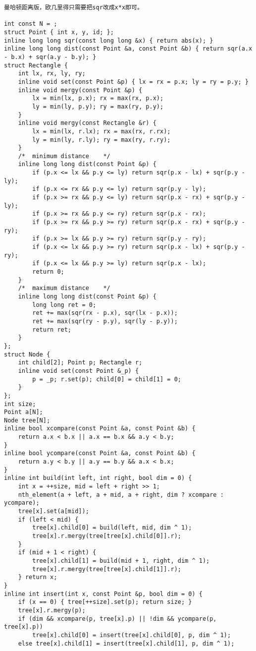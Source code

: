 \begin{lstlisting}
曼哈顿距离版，欧几里得只需要把sqr改成x*x即可。

int const N = ;
struct Point { int x, y, id; };
inline long long sqr(const long long &x) { return abs(x); }
inline long long dist(const Point &a, const Point &b) { return sqr(a.x - b.x) + sqr(a.y - b.y); }
struct Rectangle {
	int lx, rx, ly, ry;
	inline void set(const Point &p) { lx = rx = p.x; ly = ry = p.y; }
	inline void mergy(const Point &p) {
		lx = min(lx, p.x); rx = max(rx, p.x);
		ly = min(ly, p.y); ry = max(ry, p.y);
	}
	inline void mergy(const Rectangle &r) {
		lx = min(lx, r.lx); rx = max(rx, r.rx);
		ly = min(ly, r.ly); ry = max(ry, r.ry);
	}
	/*	minimum distance	*/
	inline long long dist(const Point &p) {
		if (p.x <= lx && p.y <= ly) return sqr(p.x - lx) + sqr(p.y - ly);
		if (p.x <= rx && p.y <= ly) return sqr(p.y - ly);
		if (p.x >= rx && p.y <= ly) return sqr(p.x - rx) + sqr(p.y - ly);
		if (p.x >= rx && p.y <= ry) return sqr(p.x - rx);
		if (p.x >= rx && p.y >= ry) return sqr(p.x - rx) + sqr(p.y - ry);
		if (p.x >= lx && p.y >= ry) return sqr(p.y - ry);
		if (p.x <= lx && p.y >= ry) return sqr(p.x - lx) + sqr(p.y - ry);
		if (p.x <= lx && p.y >= ly) return sqr(p.x - lx);
		return 0;
	}
	/*	maximum distance	*/
	inline long long dist(const Point &p) {
		long long ret = 0;
		ret += max(sqr(rx - p.x), sqr(lx - p.x));
		ret += max(sqr(ry - p.y), sqr(ly - p.y));
		return ret;
	}
};
struct Node {
	int child[2]; Point p; Rectangle r;
	inline void set(const Point &_p) {
		p = _p; r.set(p); child[0] = child[1] = 0;
	}
};
int size;
Point a[N];
Node tree[N];
inline bool xcompare(const Point &a, const Point &b) {
	return a.x < b.x || a.x == b.x && a.y < b.y;
}
inline bool ycompare(const Point &a, const Point &b) {
	return a.y < b.y || a.y == b.y && a.x < b.x;
}
inline int build(int left, int right, bool dim = 0) {
	int x = ++size, mid = left + right >> 1;
	nth_element(a + left, a + mid, a + right, dim ? xcompare : ycompare);
	tree[x].set(a[mid]);
	if (left < mid) {
		tree[x].child[0] = build(left, mid, dim ^ 1);
		tree[x].r.mergy(tree[tree[x].child[0]].r);
	}
	if (mid + 1 < right) {
		tree[x].child[1] = build(mid + 1, right, dim ^ 1);
		tree[x].r.mergy(tree[tree[x].child[1]].r);
	} return x;
}
inline int insert(int x, const Point &p, bool dim = 0) {
	if (x == 0) { tree[++size].set(p); return size; }
	tree[x].r.mergy(p);
	if (dim && xcompare(p, tree[x].p) || !dim && ycompare(p, tree[x].p))
		tree[x].child[0] = insert(tree[x].child[0], p, dim ^ 1);
	else tree[x].child[1] = insert(tree[x].child[1], p, dim ^ 1);

\end{lstlisting}
